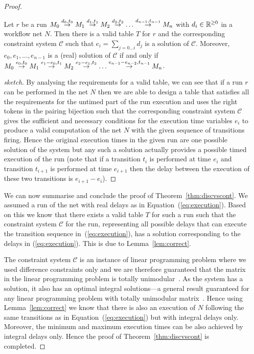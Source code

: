\begin{proof}
\begin{lemma} \label{lem:correct}
Let $r$ be a run $M_0 \stackrel{d_0,t_0}{\rightarrow} M_1 \stackrel{d_1,t_1}{\rightarrow} M_2 \stackrel{d_2,t_2}{\rightarrow} 
\ldots \stackrel{d_{n-1},t_{n-1}}{\rightarrow} M_{n}$ with $d_i \in \mathbb{R}^{\geq 0}$ in a workflow
net $N$. Then there is a valid table $T$ for $r$
and the corresponding constraint system $\mathscr{C}$ such that
$e_i= \sum_{j=0 \ldots i} d_j$ is a solution of $\mathscr{C}$. 
Moreover, $e_0, e_1, \ldots, e_{n-1}$ is a (real) solution of 
$\mathscr{C}$ if and only if
$M_0 \stackrel{e_0,t_0}{\rightarrow} M_1 \stackrel{e_1-e_0,t_1}{\rightarrow} M_2 \stackrel{e_2-e_1,t_2}{\rightarrow} 
\ldots \stackrel{e_{n-1}-e_{n-2},t_{n-1}}{\rightarrow} M_{n}$.
\end{lemma}
\begin{proof}[sketch]
By analysing the requirements for a valid table, we can see that if
a run $r$ can be performed in the net $N$ then we are able to 
design a table that satisfies all the requirements for the untimed
part of the run execution and uses the right tokens in the pairing
bijection such that the corresponding constraint system $\mathscr{C}$
gives the sufficient and necessary
conditions for the execution time variables $e_i$ to produce a valid
computation of the net $N$ with the given sequence of transitions firing. 
Hence the original execution times in the given run are one possible solution of 
the system but any such a solution actually provides a possible
timed execution of the run (note that if a transition $t_i$ is performed 
at time $e_i$ and transition $t_{i+1}$ is performed at time $e_{i+1}$ then
the delay between the execution of these two transitions is $e_{i+1}-e_{i}$).
\end{proof}

We can now summarise and conclude the proof of Theorem~\ref{thm:discvscont}. 
We assumed a run of the net with real delays as in Equation~(\ref{eq:execution}).
Based on this we know that there exists a valid table $T$ for such a run such that 
the constraint system $\mathscr{C}$ for the run, representing all possible 
delays that can execute the transition sequence in~(\ref{eq:execution}), has
a solution corresponding to the delays in (\ref{eq:execution}). This is due
to Lemma~\ref{lem:correct}. 

The constraint system $\mathscr{C}$ is an instance of linear programming 
problem where we used difference constraints only and we are therefore 
guaranteed that the matrix in the linear programming problem is totally
unimodular~\cite{umodmatrix1}. As the system has a solution, it also
has an optimal integral solutions---a general result guaranteed
for any linear programming problem with totally unimodular 
matrix~\cite{umodmatrix2}.
Hence using Lemma~\ref{lem:correct} we know that there is also an execution
of $N$ following the same transitions as in Equation~(\ref{eq:execution})
but with integral delays only. Moreover, the minimum and maximum
execution times can be also achieved by integral delays only. Hence
the proof of Theorem~\ref{thm:discvscont} is completed.

\end{proof}

